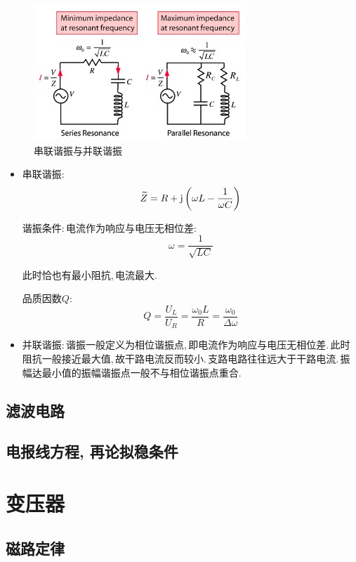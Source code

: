 \begin{figure}[H]
\centering
\includegraphics[width=8cm]{image/7-7-1.png}
\caption{串联谐振与并联谐振}
\end{figure}
\begin{itemize}
\item 串联谐振:
\[\widetilde{Z}=R+{\rm j}\left(\omega L-\frac{1}{\omega C}\right)\]

谐振条件:\,电流作为响应与电压无相位差:
\[\omega=\frac{1}{\sqrt{LC}}\]

此时恰也有最小阻抗,\,电流最大.

品质因数$Q$:
\[Q=\frac{U_L}{U_R}=\frac{\omega_0 L}{R}=\frac{\omega_0}{\Delta \omega}\]

\item 并联谐振:\,谐振一般定义为相位谐振点,\,即电流作为响应与电压无相位差.\,此时阻抗一般接近最大值,\,故干路电流反而较小.\,支路电路往往远大于干路电流.\,振幅达最小值的振幅谐振点一般不与相位谐振点重合.



\end{itemize}

\subsection{滤波电路}



\subsection{电报线方程, 再论拟稳条件}

\section{变压器}

\subsection{磁路定律}



